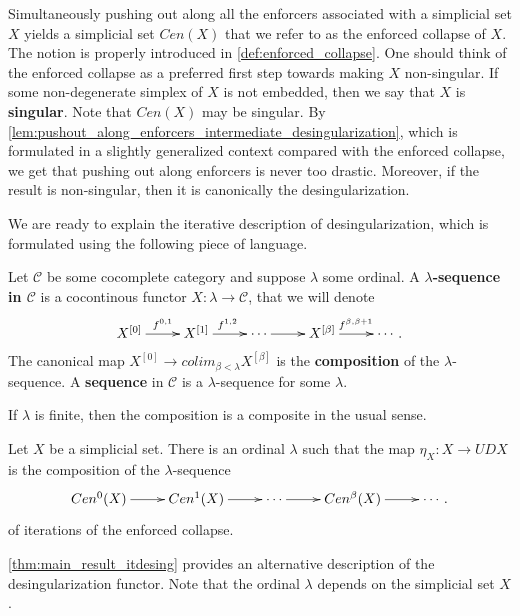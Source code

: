 Simultaneously pushing out along all the enforcers associated with a simplicial set $X$ yields a simplicial set $Cen(X)$ that we refer to as the enforced collapse of $X$. The notion is properly introduced in \cref{def:enforced_collapse}. One should think of the enforced collapse as a preferred first step towards making $X$ non-singular. If some non-degenerate simplex of $X$ is not embedded, then we say that $X$ is \textbf{singular}. Note that $Cen(X)$ may be singular. By \cref{lem:pushout_along_enforcers_intermediate_desingularization}, which is formulated in a slightly generalized context compared with the enforced collapse, we get that pushing out along enforcers is never too drastic. Moreover, if the result is non-singular, then it is canonically the desingularization.

We are ready to explain the iterative description of desingularization, which is formulated using the following piece of language.
\begin{definition}\label{def:sequence_composition}
Let $\mathscr{C}$ be some cocomplete category and suppose $\lambda$ some ordinal. A \textbf{$\lambda$-sequence in $\mathscr{C}$} is a cocontinous functor $X:\lambda \to \mathscr{C}$, that we will denote
\begin{displaymath}
\xymatrix{
X^{[0]} \ar[r]^{f^{0,1}} & X^{[1]} \ar[r]^{f^{1,2}} & \cdots \ar[r] & X^{[\beta ]}\ar[r]^{f^{\beta ,\beta +1}} & \cdots \, .
}
\end{displaymath}
The canonical map $X^{[0]}\to colim_{\beta <\lambda }X^{[\beta ]}$ is the \textbf{composition} of the $\lambda$-sequence. A \textbf{sequence} in $\mathscr{C}$ is a $\lambda$-sequence for some $\lambda$.
\end{definition}
\noindent If $\lambda$ is finite, then the composition is a composite in the usual sense.
\begin{theorem}\label{thm:main_result_itdesing}
Let $X$ be a simplicial set. There is an ordinal $\lambda$ such that the map $\eta _X:X\to UDX$ is the composition of the $\lambda$-sequence
\begin{displaymath}
\xymatrix{
Cen^0(X) \ar[r] & Cen^1(X) \ar[r] & \cdots \ar[r] & Cen^\beta (X) \ar[r] & \cdots \, .
}
\end{displaymath}
of iterations of the enforced collapse.
\end{theorem}
\noindent \cref{thm:main_result_itdesing} provides an alternative description of the desingularization functor. Note that the ordinal $\lambda$ depends on the simplicial set $X$.

